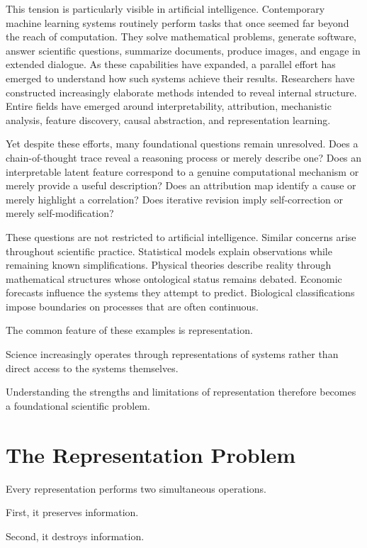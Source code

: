 \documentclass[11pt,oneside,openany]{book}
\begin{document}
This tension is particularly visible in artificial intelligence. Contemporary machine learning systems routinely perform tasks that once seemed far beyond the reach of computation. They solve mathematical problems, generate software, answer scientific questions, summarize documents, produce images, and engage in extended dialogue. As these capabilities have expanded, a parallel effort has emerged to understand how such systems achieve their results. Researchers have constructed increasingly elaborate methods intended to reveal internal structure. Entire fields have emerged around interpretability, attribution, mechanistic analysis, feature discovery, causal abstraction, and representation learning.

Yet despite these efforts, many foundational questions remain unresolved. Does a chain-of-thought trace reveal a reasoning process or merely describe one? Does an interpretable latent feature correspond to a genuine computational mechanism or merely provide a useful description? Does an attribution map identify a cause or merely highlight a correlation? Does iterative revision imply self-correction or merely self-modification?

These questions are not restricted to artificial intelligence. Similar concerns arise throughout scientific practice. Statistical models explain observations while remaining known simplifications. Physical theories describe reality through mathematical structures whose ontological status remains debated. Economic forecasts influence the systems they attempt to predict. Biological classifications impose boundaries on processes that are often continuous.

The common feature of these examples is representation.

Science increasingly operates through representations of systems rather than direct access to the systems themselves.

Understanding the strengths and limitations of representation therefore becomes a foundational scientific problem.

\section{The Representation Problem}

Every representation performs two simultaneous operations.

First, it preserves information.

Second, it destroys information.
\end{document}
